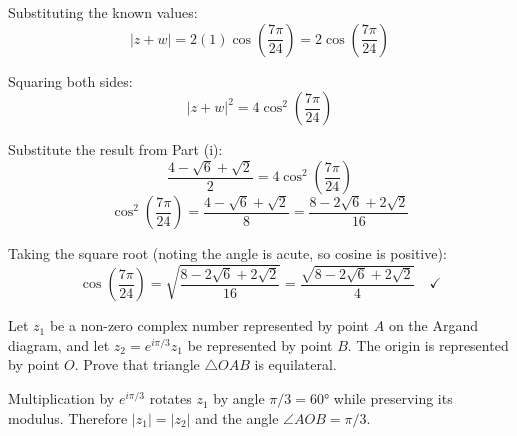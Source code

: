 \begin{solution}
Substituting the known values:
\[
|z+w| = 2(1)\cos\left(\frac{7\pi}{24}\right) = 2\cos\left(\frac{7\pi}{24}\right)
\]

Squaring both sides:
\[
|z+w|^2 = 4\cos^2\left(\frac{7\pi}{24}\right)
\]

Substitute the result from Part (i):
\[
\frac{4 - \sqrt{6} + \sqrt{2}}{2} = 4\cos^2\left(\frac{7\pi}{24}\right)
\]
\[
\cos^2\left(\frac{7\pi}{24}\right) = \frac{4 - \sqrt{6} + \sqrt{2}}{8} = \frac{8 - 2\sqrt{6} + 2\sqrt{2}}{16}
\]

Taking the square root (noting the angle is acute, so cosine is positive):
\[
\cos\left(\frac{7\pi}{24}\right) = \sqrt{\frac{8 - 2\sqrt{6} + 2\sqrt{2}}{16}} = \frac{\sqrt{8 - 2\sqrt{6} + 2\sqrt{2}}}{4} \quad \checkmark
\]

\end{solution}

\begin{problem}
Let $z_1$ be a non-zero complex number represented by point $A$ on the Argand diagram, and let $z_2 = e^{i\pi/3}z_1$ be represented by point $B$. The origin is represented by point $O$. Prove that triangle $\triangle OAB$ is equilateral.
\end{problem}

\begin{hint}
Multiplication by $e^{i\pi/3}$ rotates $z_1$ by angle $\pi/3 = 60°$ while preserving its modulus. Therefore $|z_1| = |z_2|$ and the angle $\angle AOB = \pi/3$.
\end{hint}

